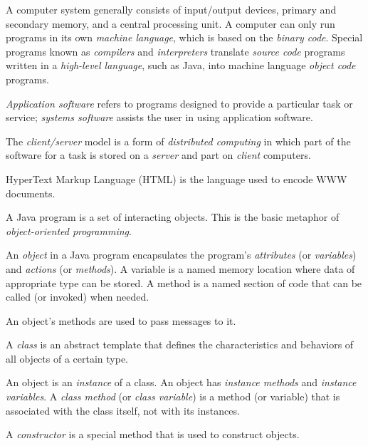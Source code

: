 \begin{SMBL}
\item A computer system generally consists of input/output devices,
primary and secondary memory, and a central processing unit.  A
computer can only run programs in its own {\it machine language},
which is based on the {\it binary code}. Special programs known as
{\it compilers} and {\it interpreters} translate {\it source code}
programs written in a {\it high-level language}, such as Java, into
machine language {\it object code} programs.

\item {\it Application software} refers to programs designed to
provide a particular task or service; {\it systems software} assists
the user in using application software.

\item The {\it client/server} model is a form of {\it distributed
computing} in which part of the software for a task is stored on a
{\it server} and part on {\it client} computers.

\item  HyperText Markup Language (HTML) is the language used to
encode WWW documents.

\item A Java program is a set of interacting objects.  This is the
basic metaphor of {\it object-oriented programming}.

\item An {\em object} in a Java program encapsulates the program's
{\em attributes} (or {\em variables}) and {\em actions} (or {\em
methods}).  A variable is a named memory location where data of
appropriate type can be stored. A method is a named section of code
that can be called (or invoked) when needed.  

\item An object's methods are used to pass messages to it. 

\item A {\em class} is an abstract template that defines the
characteristics and behaviors of all objects of a certain type.

\item An object is an {\em instance} of a class. An object has {\em
instance methods} and {\em instance variables}. A {\em class method}
(or {\em class variable}) is a method (or variable) that is associated
with the class itself, not with its instances.

\item A {\em constructor} is a special method that is used to
construct objects.


\end{SMBL}
